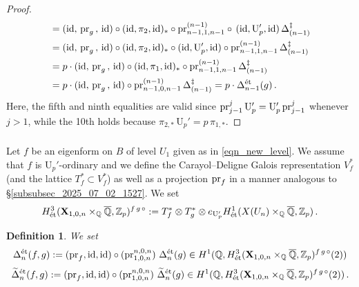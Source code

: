 \documentclass{amsart}
\numberwithin{equation}{section}
\newtheorem{defn}[theorem]{Definition}
\newcommand{\QQ}{\mathbb{Q}}
\newcommand{\ZZ}{\mathbb{Z}}
\newcommand{\id}{\mathrm{id}}
\newcommand{\etale}{\textup{\'et}}
\begin{document}
\begin{proof}
\begin{align}
     \notag   &= ({\rm id},\,{\rm pr}_g\,,\,{\rm id})\circ  ({\rm id},\pi_2,{\rm id})_*\circ {\rm pr}^{(n-1)}_{n-1,1,n-1} \circ \, ({\rm id},\mathrm{U}_{p}',{\rm id})\,\Delta_{(n-1)}^{\ddagger} \\
      \notag   &= ({\rm id},\,{\rm pr}_g\,,\,{\rm id})\circ  ({\rm id},\pi_2,{\rm id})_*\circ ({\rm id},\mathrm{U}_{p}',{\rm id})\circ {\rm pr}^{(n-1)}_{n-1,1,n-1} \,\Delta_{(n-1)}^{\ddagger}\\
      \notag   &=p\cdot  ({\rm id},\,{\rm pr}_g\,,\,{\rm id})\circ   ({\rm id},\pi_1,{\rm id})_*\circ  {\rm pr}^{(n-1)}_{n-1,1,n-1} \,\Delta_{(n-1)}^{\ddagger}\\
      \notag   &=p\cdot  ({\rm id},\,{\rm pr}_g\,,\,{\rm id})\circ    {\rm pr}^{(n-1)}_{n-1,0,n-1} \,\Delta_{(n-1)}^{\ddagger}= p\cdot \Delta_{n-1}^{\etale}(g)\,.
    \end{align}
    Here, the fifth and ninth equalities are valid since    ${\rm pr}^j_{j-1}\,\mathrm{U}_{p}'=\mathrm{U}_{p}'\,{\rm pr}^j_{j-1}$ whenever $j>1$, while the 10th holds because $\pi_{2,*}  \,\mathrm{U}_{p}'=p\, \pi_{1,*}$.
\end{proof}



\subsubsection{}
Let $f$ be an eigenform on $B$ of level $U_{1}$ given as in \eqref{eqn_new_level}. We assume that $f$ is $\mathrm{U}_p'$-ordinary and we define the Carayol--Deligne Galois representation $V_f^*$ (and the lattice $T_f^*\subset V_f^*$) as well as a projection ${\rm pr}_f$ in a manner analogous to \S\ref{subsubsec_2025_07_02_1527}. %
We set 
$$H^3_{\etale}(\mathbf{X}_{1,0,n}\times_{\QQ}
\overline{\QQ},\ZZ_p)^{f \,g\, \circ} := T_f^*\otimes T_g^* \otimes e_{\mathrm{U}_{p}'} H^1_{\etale} (X(U_{n})\times_{\QQ}
\overline{\QQ}, \ZZ_p)\,.$$
\begin{defn}
    \label{defn_2025_03_21_2027}
    We set 
    $$\Delta_{n}^{\etale}(f,g):=({\rm pr}_{f},\id,\id)\circ ({\rm pr}^{n,0,n}_{1,0,n})\,\,\Delta_{n}^{\etale}(g)\in  H^1(\QQ, H^3_{\etale}(\mathbf{X}_{1,0,n}\times_{\QQ}
\overline{\QQ},\ZZ_p)^{f \,g\, \circ} (2))$$
    $$\widetilde{\Delta}_{n}^{\etale}(f,g):=({\rm pr}_{f},\id,\id)\circ ({\rm pr}^{n,0,n}_{1,0,n})\,\,\widetilde{\Delta}_{n}^{\etale}(g)\in  H^1(\QQ, H^3_{\etale}(\mathbf{X}_{1,0,n}\times_{\QQ}
\overline{\QQ},\ZZ_p)^{f \,g\, \circ} (2))\,.$$
\end{defn}
\end{document}
